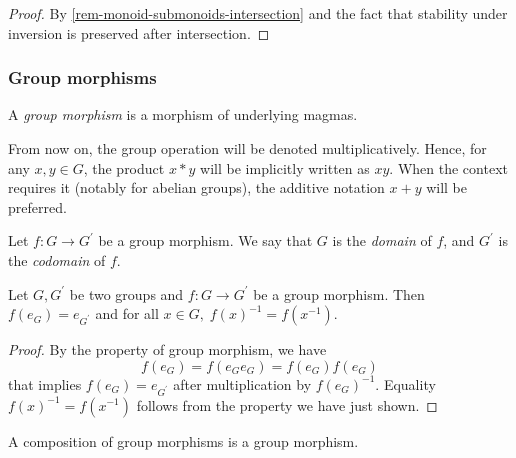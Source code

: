 \documentclass[12pt]{report}
\begin{document}
\begin{proof}
    By \ref{rem-monoid-submonoids-intersection} and the fact that stability under inversion is preserved after intersection.
\end{proof}

\subsubsection{Group morphisms}

\begin{definition} \label{def-group-morphism}
    A \emph{group morphism} is a morphism of underlying magmas.
\end{definition}

\begin{notation} \label{not-group-operation}
    From now on, the group operation will be denoted multiplicatively. 
    Hence, for any $x, y \in G$, the product $x \ast y$ will be implicitly written as $xy$. 
    When the context requires it (notably for abelian groups), the additive notation $x + y$ will be preferred.
\end{notation}

\begin{definition} \label{def-group-morphism-domain}
    Let $f \colon G \to G^{\prime}$ be a group morphism. We say that $G$ is the \emph{domain} of $f$, and $G^{\prime}$ is the \emph{codomain} of $f$.
\end{definition}

\begin{proposition} \label{prop-group-morphism-reversibility}
    Let $G, G^{\prime}$ be two groups and $f \colon G \to G^{\prime}$ be a group morphism. Then $f(e_{G}) = e_{G^{\prime}}$ and for all $x \in G, \; f(x)^{-1} = f(x^{-1})$.
\end{proposition}

\begin{proof}
    By the property of group morphism, we have
    \[
        f(e_{G}) = f(e_{G} e_{G}) = f(e_{G}) f(e_{G})
    \]
    that implies $f(e_{G}) = e_{G^\prime}$ after multiplication by $f(e_{G})^{-1}$. Equality $f(x)^{-1} = f(x^{-1})$ follows from the property we have just shown.
\end{proof}

\begin{proposition} \label{prop-group-morphism-composition}
    A composition of group morphisms is a group morphism.
\end{proposition}
\end{document}
